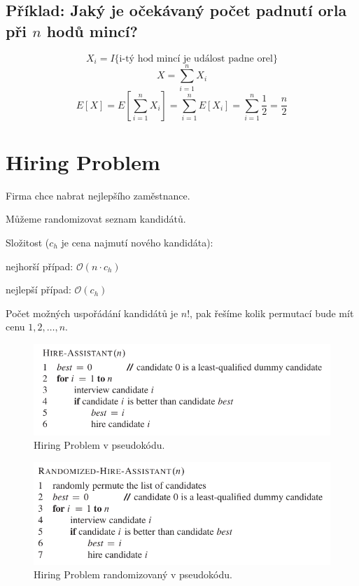 \subsection{Příklad: Jaký je očekávaný počet padnutí orla při $n$ hodů mincí?}

$$ X_i = I\{ \text{i-tý hod mincí je událost padne orel} \}$$
$$ X = \sum_{i=1}^n X_i$$
$$ E[X] = E \left[ \sum_{i=1}^n X_i \right] = \sum_{i=1}^n E \left[ X_i \right] = \sum_{i=1}^n \frac{1}{2} = \frac{n}{2}$$


\section{Hiring Problem}

\begin{compactitem}
    \item Firma chce nabrat nejlepšího zaměstnance.

    \item Můžeme randomizovat seznam kandidátů.

    \item Složitost ($c_h$ je cena najmutí nového kandidáta): \begin{compactitem}
        \item nejhorší případ: $\mathcal{O}(n \cdot c_h)$
        \item nejlepší případ: $\mathcal{O}(c_h)$
    \end{compactitem}

    \item Počet možných uspořádání kandidátů je $n!$, pak řešíme kolik permutací bude mít cenu $1, 2, \dots, n$.

\end{compactitem}

\begin{figure}[H]
    \centering
    \includegraphics[width=0.8\linewidth]{hiring_problem.pdf}
    \caption{Hiring Problem v pseudokódu.}
\end{figure}

\begin{figure}[H]
    \centering
    \includegraphics[width=0.8\linewidth]{hiring_problem_randomized.pdf}
    \caption{Hiring Problem randomizovaný v pseudokódu.}
\end{figure}

